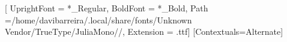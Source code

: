 \usepackage{fontspec}

\newfontfamily{}[
	UprightFont = *_Regular,
	BoldFont = *_Bold,
	Path =/home/davibarreira/.local/share/fonts/Unknown Vendor/TrueType/JuliaMono//,
	Extension = .ttf]
\newfontface{}
\newfontface{}
\setmonofont{JuliaMono-Medium}[Contextuals=Alternate]

